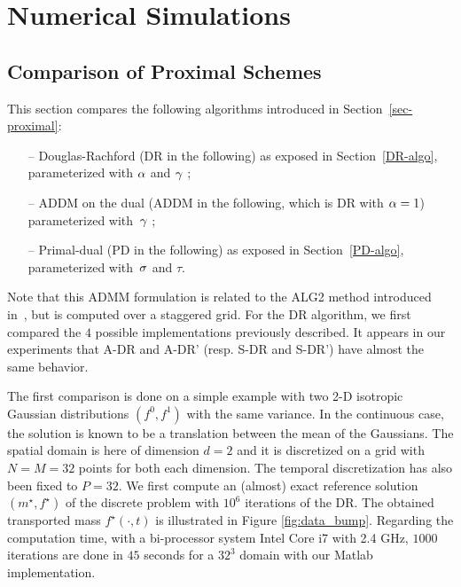\section{Numerical Simulations}


\subsection{Comparison of Proximal Schemes}

This section compares the following algorithms introduced in Section~\ref{sec-proximal}:
\begin{itemize}
	\item[--] Douglas-Rachford (DR in the following) as exposed in Section~\ref{DR-algo}, parameterized with $\alpha$ and $\gamma$ ;
	\item[--] ADDM on the dual (ADDM in the following, which is DR with $\alpha=1$) parameterized with~$\gamma$ ; 
	\item[--] Primal-dual (PD in the following) as exposed in Section~\ref{PD-algo}, parameterized with~$\sigma$ and $\tau$.
\end{itemize}
Note that this ADMM formulation is related to the ALG2 method introduced in~\cite{Benamou2000}, but is computed over a staggered grid. For the DR algorithm, we first compared the $4$ possible implementations previously described. It appears in our experiments that A-DR and A-DR' (resp. S-DR and S-DR') have almost the same behavior. 

The first comparison is done on a simple example with two 2-D isotropic Gaussian distributions $(f^0,f^1)$ with the same variance. In the continuous case, the solution is known to be a translation between the mean of the Gaussians. The spatial domain is here of dimension $d=2$ and it is discretized on a grid with $N=M=32$ points for both each dimension. The temporal  discretization has also been fixed to $P=32$. We first compute an (almost) exact reference solution $(m^\star,f^\star)$ of the discrete problem with $10^6$ iterations of the DR. The obtained transported mass $f^\star(\cdot,t)$ is illustrated in Figure \ref{fig:data_bump}. Regarding the computation time, with a bi-processor system Intel Core i7 with 2.4 GHz, $1000$ iterations are done in $45$ seconds for a $32^3$ domain with our Matlab implementation.

